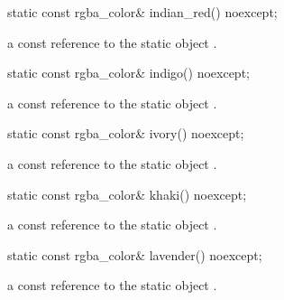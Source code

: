 \begin{itemdecl}
    static const rgba_color& indian_red() noexcept;
\end{itemdecl}
\begin{itemdescr}
    \pnum
    \returns
    a const reference to the static  object .
\end{itemdescr}

\begin{itemdecl}
    static const rgba_color& indigo() noexcept;
\end{itemdecl}
\begin{itemdescr}
    \pnum
    \returns
    a const reference to the static  object .
\end{itemdescr}

\begin{itemdecl}
    static const rgba_color& ivory() noexcept;
\end{itemdecl}
\begin{itemdescr}
    \pnum
    \returns
    a const reference to the static  object .
\end{itemdescr}

\begin{itemdecl}
    static const rgba_color& khaki() noexcept;
\end{itemdecl}
\begin{itemdescr}
    \pnum
    \returns
    a const reference to the static  object .
\end{itemdescr}

\begin{itemdecl}
    static const rgba_color& lavender() noexcept;
\end{itemdecl}
\begin{itemdescr}
    \pnum
    \returns
    a const reference to the static  object .
\end{itemdescr}

